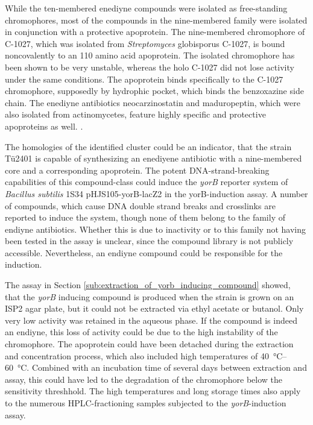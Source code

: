 	 While the ten-membered enediyne compounds were isolated as free-standing chromophores, most of the compounds in the nine-membered family were isolated in conjunction with a protective apoprotein.\autocite{Liang2010} The nine-membered chromophore of C-1027, which was isolated from \textit{Streptomyces} globisporus C-1027, is bound noncovalently to an 110 amino acid apoprotein.\autocite{AdrianL.Smith*1996,Minami1993,Yoshida1993,Otani1993,Sugiura1993,Matsumoto1993,Otani1991,Otani1988a,Matsumoto1993a} The isolated chromophore has been shown to be very unstable, whereas the holo C-1027 did not lose activity under the same conditions. \autocite{Matsumoto1993,Sugiura1993,Otani1991} The apoprotein binds specifically to the C-1027 chromophore, supposedly by hydrophic pocket, which binds the benzoxazine side chain. \autocite{Okuno1994,Matsumoto1993} The enediyne antibiotics neocarzinostatin and maduropeptin, which were also isolated from actinomycetes, feature highly specific and protective apoproteins as well. \autocite{AdrianL.Smith*1996}.
	 
	 The homologies of the identified cluster could be an indicator, that the strain Tü2401 is capable of synthesizing an enediyene antibiotic with a nine-membered core and a corresponding apoprotein. The potent DNA-strand-breaking capabilities of this compound-class could induce the \textit{yorB} reporter system of \textit{Bacillus subtilis} 1S34 pHJS105-yorB-lacZ2 in the yorB-induction assay. A number of compounds, which cause DNA double strand breaks and crosslinks are reported to induce the system, though none of them belong to the family of endiyne antibiotics. \autocite{Urban2007} Whether this is due to inactivity or to this family not having been tested in the assay is unclear, since the compound library is not publicly accessible. Nevertheless, an endiyne compound could be responsible for the induction.
	 
	 The assay in Section \ref{sub:extraction_of_yorb_inducing_compound} showed, that the \textit{yorB} inducing compound is produced when the strain is grown on an ISP2 agar plate, but it could not be extracted via ethyl acetate or butanol. Only very low activity was retained in the aqueous phase. If the compound is indeed an endiyne, this loss of activity could be due to the high instability of the chromophore. The apoprotein could have been detached during the extraction and concentration process, which also included high temperatures of \SIrange[range-units=single]{40}{60}{\celsius}. Combined with an incubation time of several days between extraction and assay, this could have led to the degradation of the chromophore below the sensitivity threshhold. The high temperatures and long storage times also apply to the numerous HPLC-fractioning samples subjected to the \textit{yorB}-induction assay. 
	 
